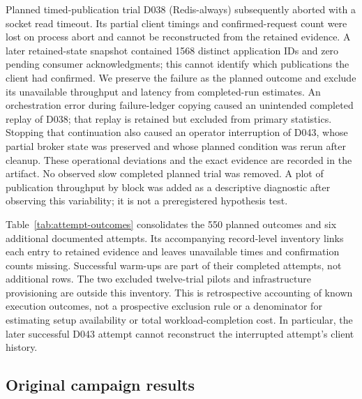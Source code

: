 Planned timed-publication trial D038 (Redis-always) subsequently aborted with a socket read timeout. Its partial client timings and confirmed-request count were lost on process abort and cannot be reconstructed from the retained evidence. A later retained-state snapshot contained 1568 distinct application IDs and zero pending consumer acknowledgments; this cannot identify which publications the client had confirmed. We preserve the failure as the planned outcome and exclude its unavailable throughput and latency from completed-run estimates. An orchestration error during failure-ledger copying caused an unintended completed replay of D038; that replay is retained but excluded from primary statistics. Stopping that continuation also caused an operator interruption of D043, whose partial broker state was preserved and whose planned condition was rerun after cleanup. These operational deviations and the exact evidence are recorded in the artifact. No observed slow completed planned trial was removed. A plot of publication throughput by block was added as a descriptive diagnostic after observing this variability; it is not a preregistered hypothesis test.

Table~\ref{tab:attempt-outcomes} consolidates the 550 planned outcomes and six additional documented attempts. Its accompanying record-level inventory links each entry to retained evidence and leaves unavailable times and confirmation counts missing. Successful warm-ups are part of their completed attempts, not additional rows. The two excluded twelve-trial pilots and infrastructure provisioning are outside this inventory. This is retrospective accounting of known execution outcomes, not a prospective exclusion rule or a denominator for estimating setup availability or total workload-completion cost. In particular, the later successful D043 attempt cannot reconstruct the interrupted attempt's client history.

\begin{table}[htbp]
\centering\small

\caption{Retained campaign outcomes and additional documented attempts. The first four rows account for all 550 planned outcomes. The remaining six attempts are separate from those outcomes. Counts do not reconstruct missing durations or establish end-to-end availability.}
\label{tab:attempt-outcomes}
\end{table}
\FloatBarrier


\subsection{Original campaign results}\label{app:history-results}
